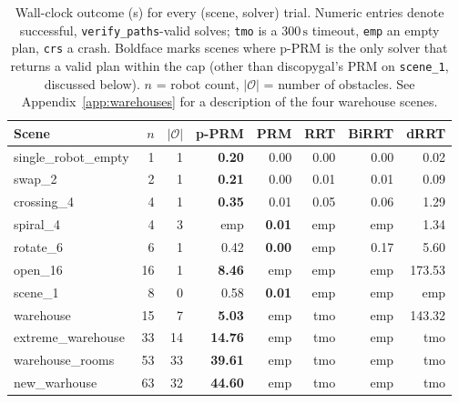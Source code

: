 \documentclass[12pt,a4paper]{article}
\begin{document}
    \begin{table}
        \centering
        \small
        \setlength{\tabcolsep}{4pt}
        \renewcommand{\arraystretch}{1.05}
        \begin{tabular}{lrr|rrrrr}
            \toprule
            Scene                & $n$ & $|\mathcal{O}|$ & \textbf{p-PRM} & PRM           & RRT  & BiRRT & dRRT   \\
            \midrule
            single\_robot\_empty & 1   & 1               & \textbf{0.20}  & 0.00          & 0.00 & 0.00  & 0.02   \\
            swap\_2              & 2   & 1               & \textbf{0.21}  & 0.00          & 0.01 & 0.01  & 0.09   \\
            crossing\_4          & 4   & 1               & \textbf{0.35}  & 0.01          & 0.05 & 0.06  & 1.29   \\
            spiral\_4            & 4   & 3               & emp            & \textbf{0.01} & emp  & emp   & 1.34   \\
            rotate\_6            & 6   & 1               & 0.42           & \textbf{0.00} & emp  & 0.17  & 5.60   \\
            open\_16             & 16  & 1               & \textbf{8.46}  & emp           & emp  & emp   & 173.53 \\
            scene\_1             & 8   & 0               & 0.58           & \textbf{0.01} & emp  & emp   & emp    \\
            warehouse            & 15  & 7               & \textbf{5.03}  & emp           & tmo  & emp   & 143.32 \\
            extreme\_warehouse   & 33  & 14              & \textbf{14.76} & emp           & tmo  & emp   & tmo    \\
            warehouse\_rooms     & 53  & 33              & \textbf{39.61} & emp           & tmo  & emp   & tmo    \\
            new\_warhouse        & 63  & 32              & \textbf{44.60} & emp           & tmo  & emp   & tmo    \\
            \bottomrule
        \end{tabular}
        \caption{Wall-clock outcome (s) for every (scene, solver) trial. Numeric entries denote successful, \texttt{verify\_paths}-valid solves; \texttt{tmo} is a $300\,\text{s}$ timeout, \texttt{emp} an empty plan, \texttt{crs} a crash. Boldface marks scenes where p-PRM is the only solver that returns a valid plan within the cap (other than discopygal's PRM on \texttt{scene\_1}, discussed below). $n$ = robot count, $|\mathcal{O}|$ = number of obstacles. See Appendix~\ref{app:warehouses} for a description of the four warehouse scenes.}
        \label{tab:results}
    \end{table}
\end{document}
